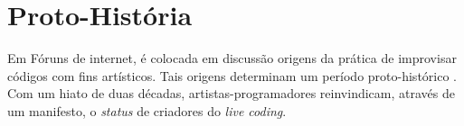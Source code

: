 


 \section*{Proto-História}

Em Fóruns de internet, é colocada em discussão origens da prática de improvisar códigos com fins artísticos. Tais origens determinam um período proto-histórico \cite{ward_live_2004}. Com um hiato de duas décadas, artistas-programadores reinvindicam, através de um manifesto, o \emph{status} de criadores do \emph{live coding}.


